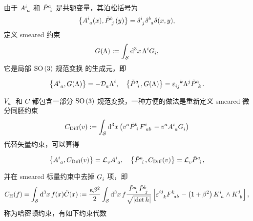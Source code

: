 		由于 $\tensor{A}{^i_a}$ 和 $\tensor{\tilde{P}}{^a_i}$ 是共轭变量，其泊松括号为
		\begin{equation}
			\left\{ \tensor{A}{^i_a}(x) , \tensor{\tilde{P}}{^b_j}(y) \right\} = \tensor{\delta}{^i_j} \tensor{\delta}{^b_a} \delta(x,y),
		\end{equation}
		定义 smeared 约束
		\begin{equation}
			G(\Lambda) := \int_{\spc} \dd[3]{x} \tensor{\Lambda}{^i} \tensor{G}{_i},\label{eq-smeared_Gauss_constrain}
		\end{equation}
		它是局部 $\mathrm{SO}\left(3\right)$ 规范变换
		的生成元，即
		\begin{Property}
			\begin{equation}
				\left\{ \tensor{A}{^i_a}, G(\Lambda) \right\} = - \AD{a} \tensor{\Lambda}{^i} \qc \left\{ \tensor{\tilde{P}}{^a_i}, G(\Lambda) \right\} = \tensor{\vol}{_i_j^k} \tensor{\Lambda}{^j} \tensor{\tilde{P}}{^a_k}.
			\end{equation}
		\end{Property}
		$\tensor{V}{_a}$ 和 $C$ 都包含一部分 $\mathrm{SO}\left(3\right)$ 规范变换，一种方便的做法是重新定义 smeared 微分同胚约束
		\begin{equation}
			C_{\text{Diff}}(v) := \int_{\spc} \dd[3]{x} \left( \tensor{v}{^a} \tensor{\tilde{P}}{^b_i} \tensor{F}{^i_a_b} - \tensor{v}{^a} \tensor{A}{^i_a} \tensor{G}{_i} \right)
		\end{equation}
		代替矢量约束，可以算得
		\begin{Property}
			\begin{equation}
				\left\{ \tensor{A}{^i_a} , C_{\text{Diff}}(v) \right\} = \Ld{v} \tensor{A}{^i_a} \qc \left\{ \tensor{\tilde{P}}{^a_i}, C_{\text{Diff}}(v) \right\} = \Ld{v} \tensor{\tilde{P}}{^a_i},
			\end{equation}
		\end{Property}
		并在 smeared 标量约束中去掉 $\tensor{G}{_i}$ 项，即
		\begin{equation}
			C_{\text{H}}(f) = \int_{\spc} \dd[3]{x} f(x) \tilde{C}(x) := \frac{\gkappa \beta^2}{2} \int_{\spc} \dd[3]{x} f \frac{\tensor{\tilde{P}}{^a_i} \tensor{\tilde{P}}{^b_j}}{\sqrt{\abs{\det h}}} \left[ \tensor{\vol}{^i^j_k} \tensor{F}{^k_a_b} - \left( 1+ \beta^2 \right) \tensor{K}{^i_a} \wedge \tensor{K}{^j_b} \right],
		\end{equation}
		称为哈密顿约束，有如下约束代数
